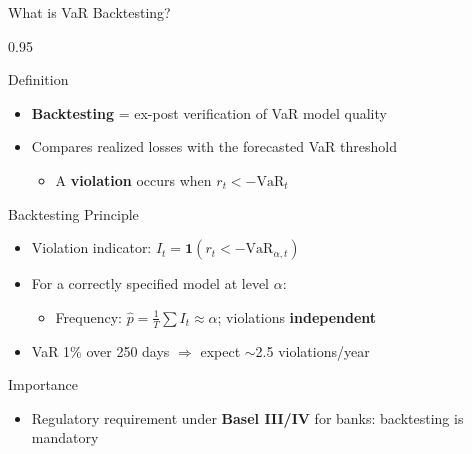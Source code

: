 \documentclass[9pt, aspectratio=169, t]{beamer}
\begin{document}
\begin{frame}{What is VaR Backtesting?}
    \begin{cminipage}{0.95\textwidth}
\small
    \begin{block}{Definition}
        \begin{itemize}\setlength{\itemsep}{0pt}
            \item \textbf{Backtesting} = ex-post verification of VaR model quality
            \item Compares realized losses with the forecasted VaR threshold
                \begin{itemize}\setlength{\itemsep}{0pt}
                    \item A \textbf{violation} occurs when $r_t < -\text{VaR}_t$
                \end{itemize}
        \end{itemize}
    \end{block}
    \vspace{-0.2cm}
    \begin{block}{Backtesting Principle}
        \begin{itemize}\setlength{\itemsep}{0pt}
            \item Violation indicator: $I_t = \mathbf{1}(r_t < -\text{VaR}_{\alpha,t})$
            \item For a correctly specified model at level $\alpha$:
                \begin{itemize}\setlength{\itemsep}{0pt}
                    \item Frequency: $\hat{p} = \frac{1}{T}\sum I_t \approx \alpha$; violations \textbf{independent}
                \end{itemize}
            \item VaR 1\% over 250 days $\Rightarrow$ expect $\sim$2.5 violations/year
        \end{itemize}
    \end{block}
    \vspace{-0.2cm}
    \begin{alertblock}{Importance}
        \begin{itemize}\setlength{\itemsep}{0pt}
            \item Regulatory requirement under \textbf{Basel III/IV} for banks: backtesting is mandatory
        \end{itemize}
    \end{alertblock}
    \end{cminipage}
\end{frame}
\end{document}
